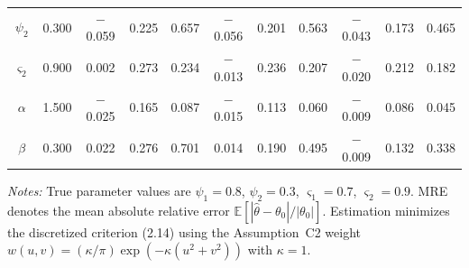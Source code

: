 \begin{table}[!h]
\begin{tabular}{ccccccccccc}
$\psi_2$ & 0.300 & $-$0.059 & 0.225 & 0.657 & $-$0.056 & 0.201 & 0.563 & $-$0.043 & 0.173 & 0.465 \\
$\varsigma_{2}$ & 0.900 & 0.002 & 0.273 & 0.234 & $-$0.013 & 0.236 & 0.207 & $-$0.020 & 0.212 & 0.182 \\
$\alpha$ & 1.500 & $-$0.025 & 0.165 & 0.087 & $-$0.015 & 0.113 & 0.060 & $-$0.009 & 0.086 & 0.045 \\
$\beta$ & 0.300 & 0.022 & 0.276 & 0.701 & 0.014 & 0.190 & 0.495 & $-$0.009 & 0.132 & 0.338 \\
\bottomrule
\end{tabular}
\begin{flushleft}
\footnotesize\textit{Notes:} True parameter values are $\psi_1 = 0.8$, $\psi_2 = 0.3$, $\varsigma_1 = 0.7$, $\varsigma_2 = 0.9$.  MRE denotes the mean absolute relative error $\mathbb{E}[|\hat\theta - \theta_0|/|\theta_0|]$.  Estimation minimizes the discretized criterion (2.14) using the Assumption~C2 weight $w(u,v)=(\kappa/\pi)\exp(-\kappa(u^2+v^2))$ with $\kappa=1$.
\end{flushleft}
\end{table}

